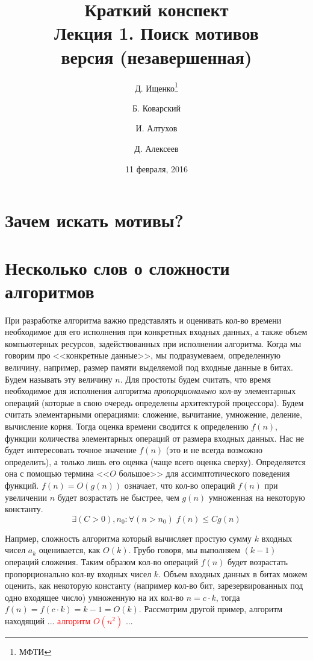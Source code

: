 \documentclass[letterpaper, 11pt]{article}
\title{\large{Краткий конспект}\\
\LARGE{Лекция 1. Поиск мотивов}\\
\normalsize версия \versionnumber (\textcolor{NavyBlue}{незавершенная})}
\date{11 февраля, 2016}
\author{Д. Ищенко\thanks{МФТИ} \and Б. Коварский\footnotemark[1]
\and И. Алтухов\footnotemark[1] \and Д. Алексеев\footnotemark[1]}
\begin{document}
\maketitle
\thispagestyle{empty}
\clearpage

\section{Зачем искать мотивы?}
\section{Несколько слов о сложности алгоритмов}
\par
При разработке алгоритма важно представлять и оценивать кол-во времени 
необходимое для его исполнения при конкретных входных данных, а также объем компьютерных ресурсов,
задействованных при исполнении алгоритма. Когда мы говорим про <<конкретные данные>>, мы подразумеваем, 
определенную величину, например, размер памяти выделяемой под входные данные в битах. Будем называть эту
величину $n$. Для простоты будем считать, что время необходимое для исполнения алгоритма \textit{пропорционально}
кол-ву элементарных операций (которые в свою очередь определены архитектурой процессора). Будем считать
элементарными операциями: сложение, вычитание, умножение, деление, вычисление корня. Тогда оценка 
времени сводится к определению $f(n)$, функции количества элементарных операций от размера входных данных. Нас не будет 
интересовать точное значение $f(n)$ (это и не всегда возможно определить), а только лишь его оценка (чаще всего оценка сверху). Определяется она с помощью термина <<$O$ большое>> для ассимптотического поведения функций.
$f(n) = O(g(n))$ означает, что кол-во операций $f(n)$ при увеличении $n$ будет возрастать не быстрее, чем $g(n)$ умноженная на некоторую константу.
\[
\exists (C > 0), n_0 : \forall (n > n_0) \; f(n) \leq Cg(n)
\]
\par
Напрмер, сложность алгоритма который вычисляет простую сумму $k$ входных чисел $a_k$ оценивается, как $O(k)$. Грубо говоря, мы выполняем $(k-1)$ операций сложения. Таким образом кол-во операций $f(n)$ будет возрастать пропорционально кол-ву входных чисел $k$. Объем входных данных в битах можем оценить, как некоторую константу (например кол-во бит, зарезервированных под одно входящее число) умноженную на их кол-во $n = c \cdot k$, тогда $f(n) = f(c \cdot k) = k - 1 = O(k)$. Рассмотрим другой пример, алгоритм находящий ... \textcolor{red}{алгоритм $O(n^2)$} ...
\par
\end{document}
